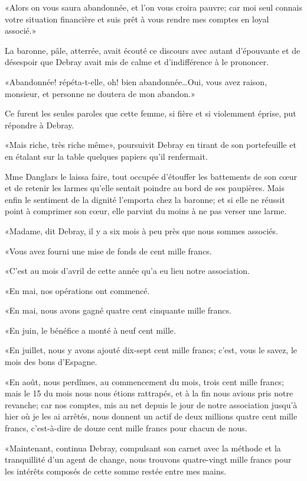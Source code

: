 «Alors on vous saura abandonnée, et l'on vous croira pauvre; car moi seul connais votre situation financière et suis prêt à vous rendre mes comptes en loyal associé.» 

La baronne, pâle, atterrée, avait écouté ce discours avec autant d'épouvante et de désespoir que Debray avait mis de calme et d'indifférence à le prononcer. 

«Abandonnée! répéta-t-elle, oh! bien abandonnée\dots Oui, vous avez raison, monsieur, et personne ne doutera de mon abandon.» 

Ce furent les seules paroles que cette femme, si fière et si violemment éprise, put répondre à Debray. 

«Mais riche, très riche même», poursuivit Debray en tirant de son portefeuille et en étalant sur la table quelques papiers qu'il renfermait. 

Mme Danglars le laissa faire, tout occupée d'étouffer les battements de son cœur et de retenir les larmes qu'elle sentait poindre au bord de ses paupières. Mais enfin le sentiment de la dignité l'emporta chez la baronne; et si elle ne réussit point à comprimer son cœur, elle parvint du moins à ne pas verser une larme. 

«Madame, dit Debray, il y a six mois à peu près que nous sommes associés. 

«Vous avez fourni une mise de fonds de cent mille francs. 

«C'est au mois d'avril de cette année qu'a eu lieu notre association. 

«En mai, nos opérations ont commencé. 

«En mai, nous avons gagné quatre cent cinquante mille francs. 

«En juin, le bénéfice a monté à neuf cent mille. 

«En juillet, nous y avons ajouté dix-sept cent mille francs; c'est, vous le savez, le mois des bons d'Espagne. 

«En août, nous perdîmes, au commencement du mois, trois cent mille francs; mais le 15 du mois nous nous étions rattrapés, et à la fin nous avions pris notre revanche; car nos comptes, mis au net depuis le jour de notre association jusqu'à hier où je les ai arrêtés, nous donnent un actif de deux millions quatre cent mille francs, c'est-à-dire de douze cent mille francs pour chacun de nous. 

«Maintenant, continua Debray, compulsant son carnet avec la méthode et la tranquillité d'un agent de change, nous trouvons quatre-vingt mille francs pour les intérêts composés de cette somme restée entre mes mains. 

